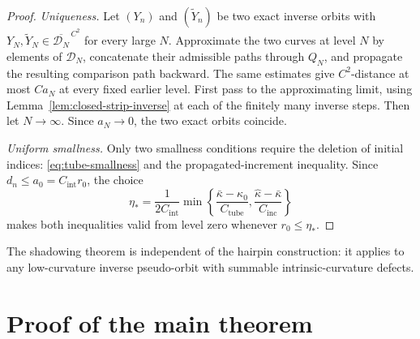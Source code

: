 \documentclass[11pt]{article}
\theoremstyle{remark}
\begin{document}
\begin{proof}
\emph{Uniqueness.}
Let \((Y_n)\) and \((\widetilde Y_n)\) be two exact inverse
orbits with \(Y_N,\widetilde Y_N\in\overline{\mathcal D_N}^{\,C^2}\) for
every large \(N\).  Approximate the two curves at level \(N\) by elements
of \(\mathcal D_N\), concatenate their admissible paths through \(Q_N\),
and propagate the resulting comparison path backward.  The same estimates
give \(C^2\)-distance at most \(Ca_N\) at every fixed earlier level.
First pass to the approximating limit, using
Lemma~\ref{lem:closed-strip-inverse} at each of the finitely many inverse
steps.  Then let \(N\to\infty\).
Since \(a_N\to0\), the two exact orbits coincide.

\emph{Uniform smallness.}
Only two smallness conditions require the deletion of initial indices:
\eqref{eq:tube-smallness} and the propagated-increment inequality.  Since
\(d_n\leq a_0=C_{\mathrm{int}}r_0\), the choice
\begin{equation}\label{eq:eta-star-explicit}
 \eta_*=\frac1{2C_{\mathrm{int}}}
 \min\left\{
   \frac{\bar\kappa-\kappa_0}{C_{\mathrm{tube}}},
   \frac{\widehat\kappa-\bar\kappa}{C_{\mathrm{inc}}}
 \right\}
\end{equation}
makes both inequalities valid from level zero whenever
\(r_0\leq\eta_*\).
\end{proof}

The shadowing theorem is independent of the hairpin construction: it applies
to any low-curvature inverse pseudo-orbit with summable intrinsic-curvature
defects.

\section{Proof of the main theorem}\label{sec:application}
\end{document}
